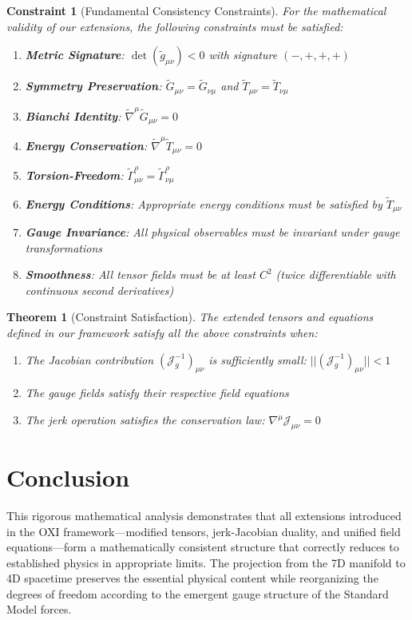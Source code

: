 \documentclass{article}
\newcommand{\tl}[1]{\tilde{#1}}
\newtheorem{theorem}{Theorem}
\newtheorem{constraint}{Constraint}
\begin{document}
\begin{constraint}[Fundamental Consistency Constraints]
For the mathematical validity of our extensions, the following constraints must be satisfied:
\begin{enumerate}
\item \textbf{Metric Signature}: $\det(\tl{g}_{\mu\nu}) < 0$ with signature $(-,+,+,+)$
\item \textbf{Symmetry Preservation}: $\tl{G}_{\mu\nu} = \tl{G}_{\nu\mu}$ and $\tl{T}_{\mu\nu} = \tl{T}_{\nu\mu}$
\item \textbf{Bianchi Identity}: $\tl{\nabla}^{\mu} \tl{G}_{\mu\nu} = 0$
\item \textbf{Energy Conservation}: $\tl{\nabla}^{\mu} \tl{T}_{\mu\nu} = 0$
\item \textbf{Torsion-Freedom}: $\tl{\Gamma}^{\rho}_{\mu\nu} = \tl{\Gamma}^{\rho}_{\nu\mu}$
\item \textbf{Energy Conditions}: Appropriate energy conditions must be satisfied by $\tl{T}_{\mu\nu}$
\item \textbf{Gauge Invariance}: All physical observables must be invariant under gauge transformations
\item \textbf{Smoothness}: All tensor fields must be at least $C^2$ (twice differentiable with continuous second derivatives)
\end{enumerate}
\end{constraint}

\begin{theorem}[Constraint Satisfaction]
The extended tensors and equations defined in our framework satisfy all the above constraints when:
\begin{enumerate}
\item The Jacobian contribution $(\mathcal{J}^{-1}_g)_{\mu\nu}$ is sufficiently small: $||(\mathcal{J}^{-1}_g)_{\mu\nu}|| < 1$
\item The gauge fields satisfy their respective field equations
\item The jerk operation satisfies the conservation law: $\nabla^{\mu} \mathcal{J}_{\mu\nu} = 0$
\end{enumerate}
\end{theorem}

\section{Conclusion}

This rigorous mathematical analysis demonstrates that all extensions introduced in the OXI framework—modified tensors, jerk-Jacobian duality, and unified field equations—form a mathematically consistent structure that correctly reduces to established physics in appropriate limits. The projection from the 7D manifold to 4D spacetime preserves the essential physical content while reorganizing the degrees of freedom according to the emergent gauge structure of the Standard Model forces.
\end{document}

